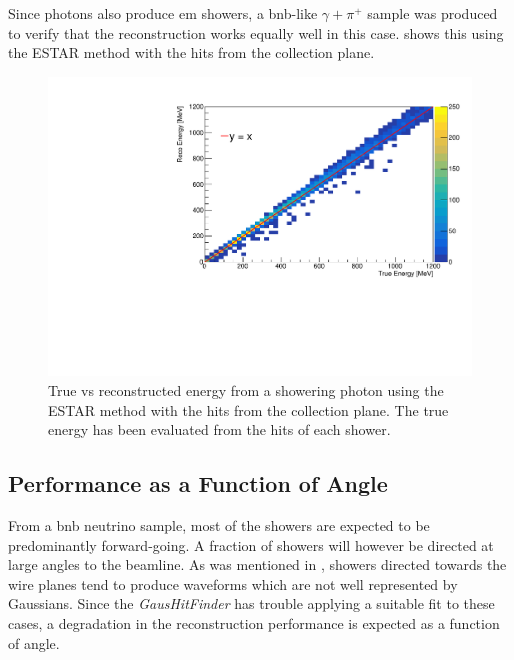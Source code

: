 Since photons also produce \gls{em} showers, a \gls{bnb}-like $\gamma + \pi^+$ sample was produced to verify that the reconstruction works equally well in this case.  shows this using the ESTAR method with the hits from the collection plane. 

\begin{figure}
    \centering
    \includegraphics[width = \largefigwidth]{figures-chap4/true_vs_reco_photon_ESTAR.pdf}
    \caption[True vs reconstructed energy from a showering photon using the ESTAR method. The true energy has been evaluated from the hits of each shower.]{True vs reconstructed energy from a showering photon using the ESTAR method with the hits from the collection plane. The true energy has been evaluated from the hits of each shower.}
    \label{fig:true_vs_reco_photon_sample}
\end{figure}

\clearpage
\subsection{Performance as a Function of Angle}

From a \gls{bnb} neutrino sample, most of the showers are expected to be predominantly forward-going. A fraction of showers will however be directed at large angles to the beamline. As was mentioned in , showers directed towards the wire planes tend to produce waveforms which are not well represented by Gaussians. Since the \textit{GausHitFinder} has trouble applying a suitable fit to these cases, a degradation in the reconstruction performance is expected as a function of angle.

